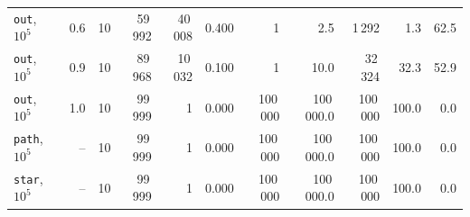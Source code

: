 \begin{tabular}{@{}lrrrrrrrrrr@{}}
\texttt{out}, $10^5$ & 0.6 & 10 & 59\,992 & 40\,008 & 0.400 & 1 & 2.5 & 1\,292 & 1.3 & 62.5 \\
\texttt{out}, $10^5$ & 0.9 & 10 & 89\,968 & 10\,032 & 0.100 & 1 & 10.0 & 32\,324 & 32.3 & 52.9 \\
\texttt{out}, $10^5$ & 1.0 & 10 & 99\,999 & 1 & 0.000 & 100\,000 & 100\,000.0 & 100\,000 & 100.0 & 0.0 \\
\midrule
\texttt{path}, $10^5$ & -- & 10 & 99\,999 & 1 & 0.000 & 100\,000 & 100\,000.0 & 100\,000 & 100.0 & 0.0 \\
\midrule
\texttt{star}, $10^5$ & -- & 10 & 99\,999 & 1 & 0.000 & 100\,000 & 100\,000.0 & 100\,000 & 100.0 & 0.0 \\
\bottomrule
\end{tabular}
